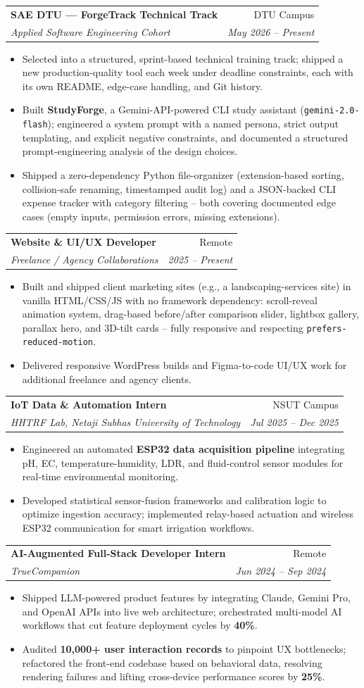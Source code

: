 \documentclass[letterpaper,10.5pt]{article}
\makeatletter
\newcommand{\resumeItem}[1]{
  \item\small{#1 \vspace{-2pt}}
}
\newcommand{\resumeSubheading}[4]{
  \vspace{-2pt}\item
    \begin{tabular*}{0.97\textwidth}[t]{l@{\extracolsep{\fill}}r}
      \textbf{#1} & \small #2 \\
      \textit{\small#3} & \textit{\small #4} \\
    \end{tabular*}\vspace{-5pt}
}
\newcommand{\resumeItemListStart}{\begin{itemize}[leftmargin=0.18in]}
\newcommand{\resumeItemListEnd}{\end{itemize}\vspace{-4pt}}
\makeatother
\begin{document}
  \resumeSubheading
    {SAE DTU --- ForgeTrack Technical Track}{DTU Campus}
    {Applied Software Engineering Cohort}{May 2026 -- Present}
    \resumeItemListStart
      \resumeItem{Selected into a structured, sprint-based technical training track; shipped a new production-quality tool each week under deadline constraints, each with its own README, edge-case handling, and Git history.}
      \resumeItem{Built \textbf{StudyForge}, a Gemini-API-powered CLI study assistant (\texttt{gemini-2.0-flash}); engineered a system prompt with a named persona, strict output templating, and explicit negative constraints, and documented a structured prompt-engineering analysis of the design choices.}
      \resumeItem{Shipped a zero-dependency Python file-organizer (extension-based sorting, collision-safe renaming, timestamped audit log) and a JSON-backed CLI expense tracker with category filtering -- both covering documented edge cases (empty inputs, permission errors, missing extensions).}
    \resumeItemListEnd

  \resumeSubheading
    {Website \& UI/UX Developer}{Remote}
    {Freelance / Agency Collaborations}{2025 -- Present}
    \resumeItemListStart
      \resumeItem{Built and shipped client marketing sites (e.g., a landscaping-services site) in vanilla HTML/CSS/JS with no framework dependency: scroll-reveal animation system, drag-based before/after comparison slider, lightbox gallery, parallax hero, and 3D-tilt cards -- fully responsive and respecting \texttt{prefers-reduced-motion}.}
      \resumeItem{Delivered responsive WordPress builds and Figma-to-code UI/UX work for additional freelance and agency clients.}
    \resumeItemListEnd

  \resumeSubheading
    {IoT Data \& Automation Intern}{NSUT Campus}
    {HHTRF Lab, Netaji Subhas University of Technology}{Jul 2025 -- Dec 2025}
    \resumeItemListStart
      \resumeItem{Engineered an automated \textbf{ESP32 data acquisition pipeline} integrating pH, EC, temperature-humidity, LDR, and fluid-control sensor modules for real-time environmental monitoring.}
      \resumeItem{Developed statistical sensor-fusion frameworks and calibration logic to optimize ingestion accuracy; implemented relay-based actuation and wireless ESP32 communication for smart irrigation workflows.}
    \resumeItemListEnd

  \resumeSubheading
    {AI-Augmented Full-Stack Developer Intern}{Remote}
    {TrueCompanion}{Jun 2024 -- Sep 2024}
    \resumeItemListStart
      \resumeItem{Shipped LLM-powered product features by integrating Claude, Gemini Pro, and OpenAI APIs into live web architecture; orchestrated multi-model AI workflows that cut feature deployment cycles by \textbf{40\%}.}
      \resumeItem{Audited \textbf{10,000+ user interaction records} to pinpoint UX bottlenecks; refactored the front-end codebase based on behavioral data, resolving rendering failures and lifting cross-device performance scores by \textbf{25\%}.}
    \resumeItemListEnd
\end{document}
